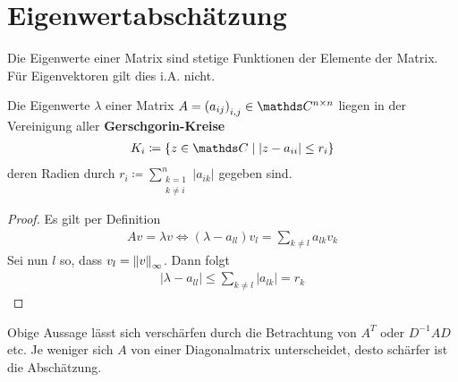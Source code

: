 % 
% 
% 
% 


\chapter{Eigenwertabschätzung}

Die Eigenwerte einer Matrix sind stetige Funktionen
der Elemente der Matrix.
Für Eigenvektoren gilt dies i.A. nicht.

\begin{Satze}[Gerschgorin, 1931]
  Die Eigenwerte $\lambda$ einer Matrix
  $A=\left(a_{ij}\right)_{i,j}\in \C^{n\times n}$
  liegen in der Vereinigung aller 
  \textbf{Gerschgorin-Kreise}
  \begin{gather*}
    K_i\coloneqq\left\{ z\in\C \mid |z-a_{ii}| \leq r_i\right\}
  \end{gather*}
  deren Radien durch 
  $r_i\coloneqq \sum_{\substack{k=1\\k\neq i}}^{n}|a_{ik}|$
  gegeben sind.

  \begin{proof}
    Es gilt per Definition
    \begin{gather*}
      Av=\lambda v \Leftrightarrow 
      (\lambda - a_{ll})v_l = \sum_{k\neq l} a_{lk}v_k
    \end{gather*}
    Sei nun $l$ so, dass $v_l=\nn[v]_\infty$. Dann folgt
    \begin{gather*}
      |\lambda - a_{ll} | \leq \sum_{k\neq l} |a_{lk}|=r_k
    \end{gather*}
  \end{proof}
\end{Satze}

  Obige Aussage lässt sich verschärfen durch
  die Betrachtung von $A^T$ oder $D^{-1}AD$ etc.
  Je weniger sich $A$ von einer Diagonalmatrix unterscheidet,
  desto schärfer ist die Abschätzung.

